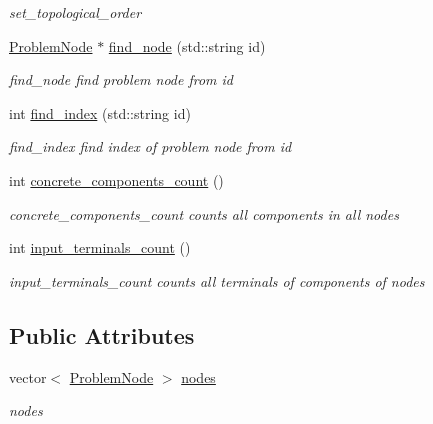 \begin{DoxyCompactItemize}
\begin{DoxyCompactList}\small\item\em set\+\_\+topological\+\_\+order \end{DoxyCompactList}\item 
\hyperlink{class_problem_node}{Problem\+Node} $\ast$ \hyperlink{class_problem_a51ab2bf5d05d403e1b9449bb60dc141d}{find\+\_\+node} (std\+::string id)
\begin{DoxyCompactList}\small\item\em find\+\_\+node find problem node from id \end{DoxyCompactList}\item 
int \hyperlink{class_problem_a9d2a62788314d0675c8252ab9e96beaa}{find\+\_\+index} (std\+::string id)
\begin{DoxyCompactList}\small\item\em find\+\_\+index find index of problem node from id \end{DoxyCompactList}\item 
int \hyperlink{class_problem_a84a3b3738d60ccbb3984aa52e2de6c69}{concrete\+\_\+components\+\_\+count} ()
\begin{DoxyCompactList}\small\item\em concrete\+\_\+components\+\_\+count counts all components in all nodes \end{DoxyCompactList}\item 
int \hyperlink{class_problem_a0e311db20018be50a67f150cf30f3b49}{input\+\_\+terminals\+\_\+count} ()
\begin{DoxyCompactList}\small\item\em input\+\_\+terminals\+\_\+count counts all terminals of components of nodes \end{DoxyCompactList}\end{DoxyCompactItemize}
\subsection*{Public Attributes}
\begin{DoxyCompactItemize}
\item 
vector$<$ \hyperlink{class_problem_node}{Problem\+Node} $>$ \hyperlink{class_problem_a66d425243e0a5896f2ad1bf006cd7e8f}{nodes}\hypertarget{class_problem_a66d425243e0a5896f2ad1bf006cd7e8f}{}\label{class_problem_a66d425243e0a5896f2ad1bf006cd7e8f}

\begin{DoxyCompactList}\small\item\em nodes \end{DoxyCompactList}\end{DoxyCompactItemize}
